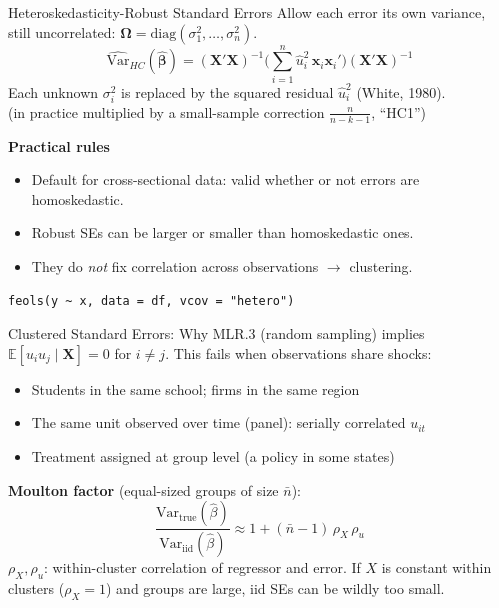 \documentclass[9pt,aspectratio=169]{beamer}
\newcommand{\E}{\mathbb{E}}
\newcommand{\Var}{\mathrm{Var}}
\begin{document}
\begin{frame}[fragile]{Heteroskedasticity-Robust Standard Errors}
\linespread{1.2}\selectfont
  Allow each error its own variance, still uncorrelated: $\bm\Omega=\mathrm{diag}(\sigma^2_1,\dots,\sigma^2_n)$.
  \[
    \widehat{\Var}_{HC}(\hat{\bm\beta})=(\bm X'\bm X)^{-1}\Big(\sum_{i=1}^{n}\hat u_i^2\,\bm x_i\bm x_i'\Big)(\bm X'\bm X)^{-1}
  \]
  Each unknown $\sigma^2_i$ is replaced by the squared residual $\hat u_i^2$ (White, 1980).\\
  (in practice multiplied by a small-sample correction $\frac{n}{n-k-1}$, ``HC1'')
  \medskip

  \textbf{Practical rules}
  \begin{itemize}
    \item Default for cross-sectional data: valid whether or not errors are homoskedastic.
    \item Robust SEs can be larger or smaller than homoskedastic ones.
    \item They do \emph{not} fix correlation across observations $\rightarrow$ clustering.
  \end{itemize}
  \begin{lstlisting}
feols(y ~ x, data = df, vcov = "hetero")
  \end{lstlisting}
\end{frame}

\begin{frame}{Clustered Standard Errors: Why}
\linespread{1.2}\selectfont
  MLR.3 (random sampling) implies $\E[u_iu_j\mid\bm X]=0$ for $i\neq j$. This fails when observations share shocks:
  \begin{itemize}
    \item Students in the same school; firms in the same region
    \item The same unit observed over time (panel): serially correlated $u_{it}$
    \item Treatment assigned at group level (a policy in some states)
  \end{itemize}
  \medskip
  \textbf{Moulton factor} (equal-sized groups of size $\bar n$):
  \[
    \frac{\Var_{\text{true}}(\hat\beta)}{\Var_{\text{iid}}(\hat\beta)} \approx 1 + (\bar n-1)\,\rho_X\,\rho_u
  \]
  $\rho_X,\rho_u$: within-cluster correlation of regressor and error. If $X$ is constant within clusters ($\rho_X=1$) and groups are large, iid SEs can be wildly too small.
\end{frame}
\end{document}
